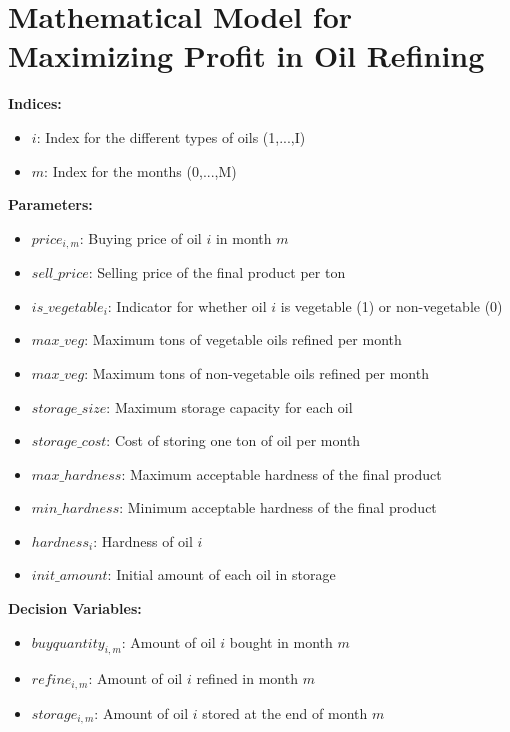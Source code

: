 \documentclass{article}
\begin{document}
\section*{Mathematical Model for Maximizing Profit in Oil Refining}

\textbf{Indices:} \\
\begin{itemize}
    \item $i$: Index for the different types of oils (1,...,I)
    \item $m$: Index for the months (0,...,M)
\end{itemize}

\textbf{Parameters:} \\
\begin{itemize}
    \item $price_{i,m}$: Buying price of oil $i$ in month $m$
    \item $sell\_price$: Selling price of the final product per ton
    \item $is\_vegetable_i$: Indicator for whether oil $i$ is vegetable (1) or non-vegetable (0)
    \item $max\_veg$: Maximum tons of vegetable oils refined per month
    \item $max\_veg$: Maximum tons of non-vegetable oils refined per month
    \item $storage\_size$: Maximum storage capacity for each oil
    \item $storage\_cost$: Cost of storing one ton of oil per month
    \item $max\_hardness$: Maximum acceptable hardness of the final product
    \item $min\_hardness$: Minimum acceptable hardness of the final product
    \item $hardness_i$: Hardness of oil $i$
    \item $init\_amount$: Initial amount of each oil in storage
\end{itemize}

\textbf{Decision Variables:} \\
\begin{itemize}
    \item $buyquantity_{i,m}$: Amount of oil $i$ bought in month $m$
    \item $refine_{i,m}$: Amount of oil $i$ refined in month $m$
    \item $storage_{i,m}$: Amount of oil $i$ stored at the end of month $m$
\end{itemize}
\end{document}
